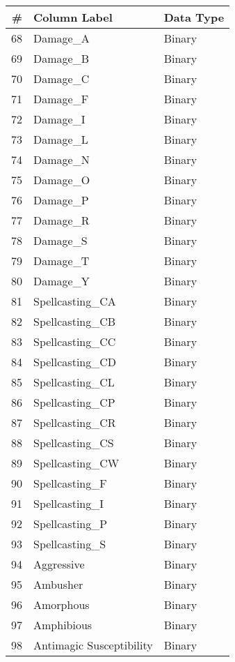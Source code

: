 \documentclass[12pt]{diazessay}
\begin{document}
\begin{table}[ht]
\begin{tiny}
\begin{minipage}[b]{0.45\linewidth}
\begin{tabular}{@{}rll@{}}
	\bottomrule
\end{tabular}
\end{minipage}
\hspace{0.5cm}
\begin{minipage}[b]{0.45\linewidth}\centering
\begin{tabular}{@{}rll@{}}
	\toprule
	\# & Column Label & Data Type \\
	\midrule
	68 & Damage\_A & Binary \\
	69 & Damage\_B & Binary \\
	70 & Damage\_C & Binary \\
	71 & Damage\_F & Binary \\
	72 & Damage\_I & Binary \\
	73 & Damage\_L & Binary \\
	74 & Damage\_N & Binary \\
	75 & Damage\_O & Binary \\
	76 & Damage\_P & Binary \\
	77 & Damage\_R & Binary \\
	78 & Damage\_S & Binary \\
	79 & Damage\_T & Binary \\
	80 & Damage\_Y & Binary \\
	81 & Spellcasting\_CA & Binary \\
	82 & Spellcasting\_CB & Binary \\
	83 & Spellcasting\_CC & Binary \\
	84 & Spellcasting\_CD & Binary \\
	85 & Spellcasting\_CL & Binary \\
	86 & Spellcasting\_CP & Binary \\
	87 & Spellcasting\_CR & Binary \\
	88 & Spellcasting\_CS & Binary \\
	89 & Spellcasting\_CW & Binary \\
	90 & Spellcasting\_F & Binary \\
	91 & Spellcasting\_I & Binary \\
	92 & Spellcasting\_P & Binary \\
	93 & Spellcasting\_S & Binary \\
	94 & Aggressive & Binary \\
	95 & Ambusher & Binary \\
	96 & Amorphous & Binary \\
	97 & Amphibious & Binary \\
	98 & Antimagic Susceptibility & Binary \\

\end{tabular}
\end{minipage}
\end{tiny}
\end{table}
\end{document}
